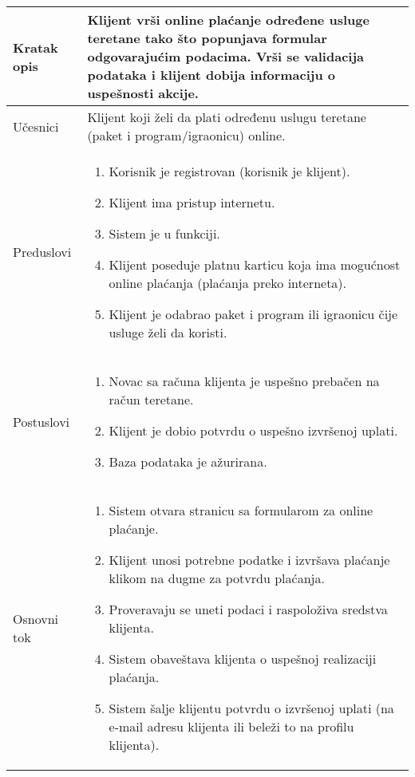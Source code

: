 \documentclass[../main.tex]{subfiles}
\begin{document}

\begin{longtable}{| p{} | p{} |} 
\hline
    Kratak opis & Klijent vrši online plaćanje određene usluge teretane tako što popunjava formular odgovarajućim podacima. Vrši se validacija podataka i klijent dobija informaciju o uspešnosti akcije.\\ 
\hline    
    Učesnici & Klijent koji želi da plati određenu uslugu teretane (paket i program/igraonicu) online.\\
\hline
   Preduslovi & \begin{enumerate}
       \item Korisnik je registrovan (korisnik je klijent).
       \item Klijent ima pristup internetu.
       \item Sistem je u funkciji.
       \item Klijent poseduje platnu karticu koja ima mogućnost online plaćanja (plaćanja preko interneta).
       \item Klijent je odabrao paket i program ili igraonicu čije usluge želi da koristi.
   \end{enumerate}\\
\hline  
    Postuslovi & \begin{enumerate}
        \item Novac sa računa klijenta je uspešno prebačen na račun teretane.
		\item Klijent je dobio potvrdu o uspešno izvršenoj uplati. %
        \item Baza podataka je ažurirana.
    \end{enumerate}\\
\hline
    Osnovni tok & \begin{enumerate}
 		\item Sistem otvara stranicu sa formularom za online plaćanje.
		\item Klijent unosi potrebne podatke i izvršava plaćanje klikom na dugme za potvrdu plaćanja.
		\item Proveravaju se uneti podaci i raspoloživa sredstva klijenta.
		\item Sistem obaveštava klijenta o uspešnoj realizaciji plaćanja.
        \item Sistem šalje klijentu potvrdu o izvršenoj uplati (na e-mail adresu klijenta ili beleži to na profilu klijenta).

\end{enumerate}
\end{longtable}
\end{document}

